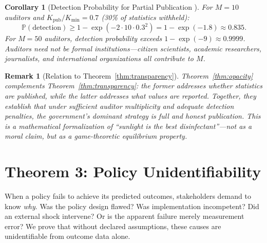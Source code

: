 \documentclass[11pt,a4paper]{article}
\newtheorem{corollary}[theorem]{Corollary}
\newtheorem{remark}[theorem]{Remark}
\theoremstyle{definition}
\newcommand{\Pbb}{\mathbb{P}}
\begin{document}
\begin{corollary}[Detection Probability for Partial Publication ]
\label{cor:partial_publication}
For $M = 10$ auditors and $K_{\mathrm{pub}} / K_{\min} = 0.7$ (30\% of statistics withheld):
\begin{equation}
    \Pbb(\text{detection}) \geq 1 - \exp(-2 \cdot 10 \cdot 0.3^2) = 1 - \exp(-1.8) \approx 0.835.
    \label{eq:example_opacity}
\end{equation}
For $M = 50$ auditors, detection probability exceeds $1 - \exp(-9) \approx 0.9999$. Auditors need not be formal institutions---citizen scientists, academic researchers, journalists, and international organizations all contribute to $M$.
\end{corollary}
\begin{remark}[Relation to Theorem~\ref{thm:transparency}]
\label{rem:opacity_relation}
Theorem~\ref{thm:opacity} complements Theorem~\ref{thm:transparency}: the former addresses \textit{whether} statistics are published, while the latter addresses \textit{what values} are reported. Together, they establish that under sufficient auditor multiplicity and adequate detection penalties, the government's dominant strategy is full and honest publication. This is a mathematical formalization of ``sunlight is the best disinfectant''---not as a moral claim, but as a game-theoretic equilibrium property.
\end{remark}
\section{Theorem 3: Policy Unidentifiability}
\label{sec:policy_unident}
When a policy fails to achieve its predicted outcomes, stakeholders demand to know \textit{why}. Was the policy design flawed? Was implementation incompetent? Did an external shock intervene? Or is the apparent failure merely measurement error? We prove that without declared assumptions, these causes are unidentifiable from outcome data alone.
\end{document}
